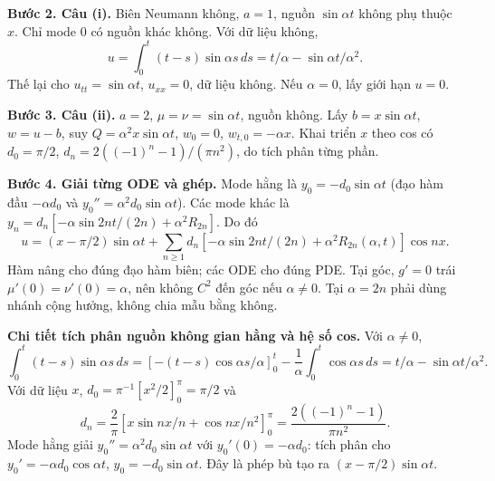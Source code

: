 \documentclass[10pt,a4paper]{article}
\begin{document}
\textbf{Bước 2. Câu (i).} Biên Neumann không, $a=1$, nguồn $\sin\alpha t$ không phụ thuộc $x$. Chỉ mode $0$ có nguồn khác không. Với dữ liệu không,
\[u=\int_0^t(t-s)\sin\alpha s\,ds=t/\alpha-\sin\alpha t/\alpha^2.\]
Thế lại cho $u_{tt}=\sin\alpha t$, $u_{xx}=0$, dữ liệu không. Nếu $\alpha=0$, lấy giới hạn $u=0$.

\textbf{Bước 3. Câu (ii).} $a=2$, $\mu=\nu=\sin\alpha t$, nguồn không. Lấy $b=x\sin\alpha t$, $w=u-b$, suy $Q=\alpha^2x\sin\alpha t$, $w_0=0$, $w_{t,0}=-\alpha x$. Khai triển $x$ theo cos có $d_0=\pi/2$, $d_n=2((-1)^n-1)/(\pi n^2)$, do tích phân từng phần.

\textbf{Bước 4. Giải từng ODE và ghép.} Mode hằng là $y_0=-d_0\sin\alpha t$ (đạo hàm đầu $-\alpha d_0$ và $y_0''=\alpha^2d_0\sin\alpha t$). Các mode khác là $y_n=d_n[-\alpha\sin2nt/(2n)+\alpha^2R_{2n}]$. Do đó
\[u=(x-\pi/2)\sin\alpha t+\sum_{n\ge1}d_n[-\alpha\sin2nt/(2n)+\alpha^2R_{2n}(\alpha,t)]\cos nx.\]
Hàm nâng cho đúng đạo hàm biên; các ODE cho đúng PDE. Tại góc, $g'=0$ trái $\mu'(0)=\nu'(0)=\alpha$, nên không $C^2$ đến góc nếu $\alpha\ne0$. Tại $\alpha=2n$ phải dùng nhánh cộng hưởng, không chia mẫu bằng không.

\textbf{Chi tiết tích phân nguồn không gian hằng và hệ số cos.} Với $\alpha\ne0$,
\[\int_0^t(t-s)\sin\alpha s\,ds
=\left[-(t-s)\cos\alpha s/\alpha\right]_0^t-\frac1\alpha\int_0^t\cos\alpha s\,ds
=t/\alpha-\sin\alpha t/\alpha^2.\]
Với dữ liệu $x$, $d_0=\pi^{-1}[x^2/2]_0^\pi=\pi/2$ và
\[d_n=\frac2\pi\left[x\sin nx/n+\cos nx/n^2\right]_0^\pi
=\frac{2((-1)^n-1)}{\pi n^2}.\]
Mode hằng giải $y_0''=\alpha^2d_0\sin\alpha t$ với $y_0'(0)=-\alpha d_0$: tích phân cho $y_0'=-\alpha d_0\cos\alpha t$, $y_0=-d_0\sin\alpha t$. Đây là phép bù tạo ra $(x-\pi/2)\sin\alpha t$.
\end{document}
